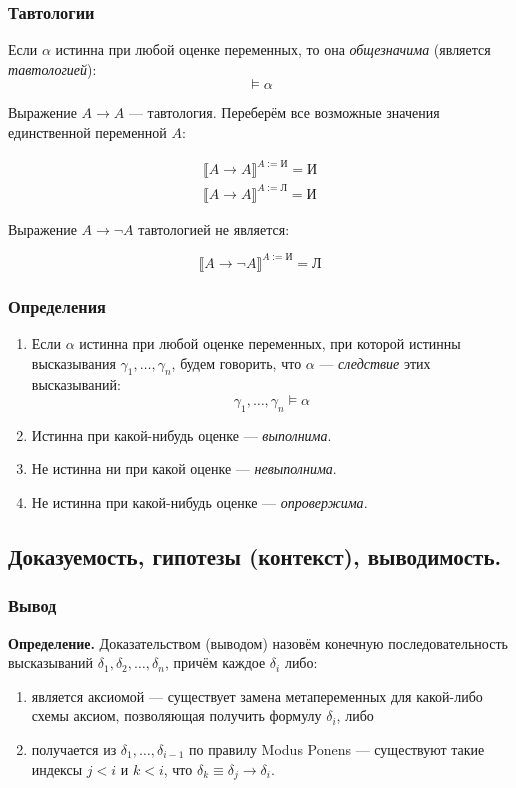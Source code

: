 \documentclass[10pt,a4paper,oneside]{article}
\begin{document}
\subsubsection{Тавтологии}

Если $\alpha$ истинна при любой оценке переменных, то она \emph{общезначима} (является \emph{тавтологией}):
$$\models \alpha$$


Выражение $A\rightarrow A$ --- тавтология. 
Переберём все возможные значения единственной переменной $A$:

$$
\begin{array}{l} \llbracket A\rightarrow A \rrbracket ^ {A := \textit{И}} = \textit{И} \\
 \llbracket A\rightarrow A \rrbracket ^ {A := \textit{Л}} = \textit{И} \end{array}
$$

Выражение $A\rightarrow\neg A$ тавтологией не является:

$$\llbracket A\rightarrow\neg A \rrbracket ^ {A := \textit{И}} = \textit{Л}$$

\subsubsection{Определения}
\begin{enumerate}
    \item Если $\alpha$ истинна при любой оценке переменных, при которой истинны 
    высказывания $\gamma_1, \dots, \gamma_n$, будем говорить, что $\alpha$ --- \emph{следствие} этих высказываний:
    $$\gamma_1, \dots, \gamma_n \models \alpha$$
    \item Истинна при какой-нибудь оценке --- \emph{выполнима}.
    \item Не истинна ни при какой оценке --- \emph{невыполнима}.
    \item Не истинна при какой-нибудь оценке --- \emph{опровержима}.
\end{enumerate}

\subsection{Доказуемость, гипотезы (контекст), выводимость.}
\subsubsection{Вывод}
\noindent \textbf{ Определение. }
Доказательством (выводом) назовём конечную последовательность высказываний $\delta_1, \delta_2, \dots, \delta_n$,
причём каждое $\delta_i$ либо:
\begin{enumerate}
\item является аксиомой --- существует замена метапеременных для какой-либо схемы аксиом, позволяющая получить
формулу $\delta_i$, либо
\item получается из $\delta_1,\dots,\delta_{i-1}$ по правилу Modus Ponens --- существуют такие индексы $j < i$ и $k < i$,
что $\delta_k \equiv \delta_j\rightarrow\delta_i$.
\end{enumerate}
\end{document}
